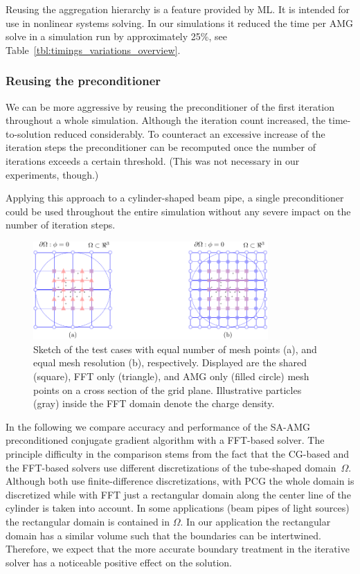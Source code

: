 \documentclass[a4paper,10pt,3p,final,pdftex]{elsarticle}
\begin{document}
Reusing the aggregation hierarchy is a feature provided by ML.  It is
intended for use in nonlinear systems solving.  In our simulations it
reduced the time per AMG solve in a simulation run by approximately
25\%, see Table~\ref{tbl:timings_variations_overview}.

\subsubsection*{Reusing the preconditioner}

We can be more aggressive by reusing the preconditioner of the first
iteration throughout a whole simulation.  Although the iteration count
increased, the time-to-solution reduced considerably.  To counteract an
excessive increase of the iteration steps the preconditioner can be
recomputed once the number of iterations exceeds a certain threshold.
(This was not necessary in our experiments, though.)

Applying this approach to a cylinder-shaped beam pipe, a single
preconditioner could be used throughout the entire simulation without
any severe impact on the number of iteration steps.

\begin{figure}[ht]
    \centering
    \includegraphics[width=0.8\textwidth]{figgrids.pdf}
    \centering
  \caption{Sketch of the test cases with equal number of mesh points
    (a), and equal mesh resolution (b), respectively.  Displayed are the
    shared (square), FFT only (triangle), and AMG only (filled circle) mesh
    points on a cross section of the grid plane.  Illustrative particles
    (gray) inside the FFT domain denote the charge density.}

  \label{fig:meshcmp}
\end{figure}

In the following we compare accuracy and performance of the
SA-AMG preconditioned conjugate gradient algorithm with a FFT-based
solver.  The principle difficulty in the comparison stems from the fact
that the CG-based and the FFT-based solvers use different
discretizations of the tube-shaped domain~$\Omega$.  Although both use
finite-difference discretizations, with PCG the whole domain is
discretized while with FFT just a rectangular domain along the center
line of the cylinder is taken into account.  In some applications
(beam pipes of light sources) the rectangular domain is contained in $\Omega$.  In
our application the rectangular domain has a similar volume such that
the boundaries can be intertwined.  Therefore, we expect that the more
accurate boundary treatment in the iterative solver has a noticeable
positive effect on the solution.
\end{document}
